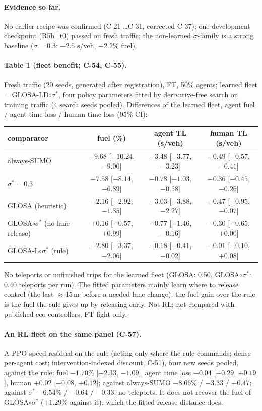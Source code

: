 \documentclass[11pt]{article}
\begin{document}
\paragraph{Evidence so far.} No earlier recipe was confirmed (C-21 \dots C-31, corrected C-37); one development checkpoint (R5h\_t0)
passed on fresh traffic; the non-learned $\sigma$-family is a strong baseline ($\sigma=0.3$: $-2.5$ s/veh, $-2.2\%$ fuel).
\paragraph{Table 1 (fleet benefit; C-54, C-55).} Fresh traffic (20 seeds, generated after registration), FT, 50\% agents; learned
fleet = GLOSA-LD$\circ\sigma^*$, four policy parameters fitted by derivative-free search on training traffic (4 search seeds pooled).
Differences of the learned fleet, agent fuel / agent time loss / human time loss (95\% CI):
\begin{center}\small\begin{tabular}{lccc}\toprule
comparator & fuel (\%) & agent TL (s/veh) & human TL (s/veh)\\\midrule
always-SUMO & $-9.68$ [$-10.24$, $-9.00$] & $-3.48$ [$-3.77$, $-3.23$] & $-0.49$ [$-0.57$, $-0.41$]\\
$\sigma^*=0.3$ & $-7.58$ [$-8.14$, $-6.89$] & $-0.78$ [$-1.03$, $-0.58$] & $-0.36$ [$-0.45$, $-0.26$]\\
GLOSA (heuristic) & $-2.16$ [$-2.92$, $-1.35$] & $-3.03$ [$-3.88$, $-2.27$] & $-0.47$ [$-0.95$, $-0.07$]\\
GLOSA$\circ\sigma^*$ (no lane release) & $+0.16$ [$-0.57$, $+0.99$] & $-0.77$ [$-1.46$, $-0.16$] & $-0.30$ [$-0.65$, $+0.00$]\\
GLOSA-L$\circ\sigma^*$ (rule) & $-2.80$ [$-3.37$, $-2.06$] & $-0.18$ [$-0.41$, $+0.02$] & $-0.01$ [$-0.10$, $+0.08$]\\\bottomrule
\end{tabular}\end{center}
No teleports or unfinished trips for the learned fleet (GLOSA: 0.50, GLOSA$\circ\sigma^*$: 0.40 teleports per run). The fitted
parameters mainly learn where to release control (the last $\approx$15\,m before a needed lane change); the fuel gain over the rule is the
fuel the rule gives up by releasing early. Not RL; not compared with published eco-controllers; FT light only.
\paragraph{An RL fleet on the same panel (C-57).} A PPO speed residual on the rule (acting only where the rule commands; dense per-agent
cost; intervention-indexed discount, C-51), four new seeds pooled, against the rule: fuel $-1.70\%$ [$-2.33$, $-1.09$], agent time loss
$-0.04$ [$-0.29$, $+0.19$], human $+0.02$ [$-0.08$, $+0.12$]; against always-SUMO $-8.66\%$ / $-3.33$ / $-0.47$; against $\sigma^*$
$-6.54\%$ / $-0.64$ / $-0.33$; no teleports. It does not recover the fuel of GLOSA$\circ\sigma^*$ ($+1.29\%$ against it), which the fitted
release distance does.
\end{document}
